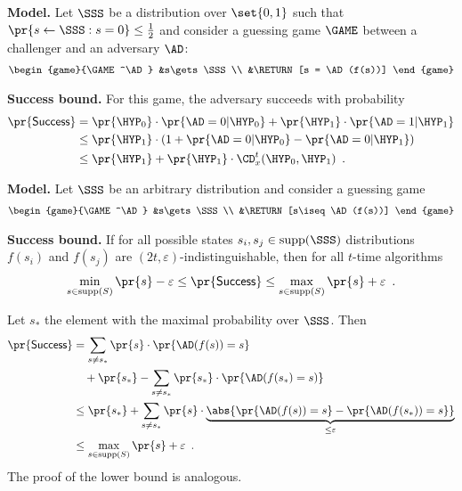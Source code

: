 \documentclass[landscape,footrule]{foils}
\begin{document}

\textbf{Model.} Let $\SSS$ be a distribution over $\set{0,1}$ such that
$\pr{s\gets\SSS:s=0}\leq\frac{1}{2}$ and consider a
guessing game $\GAME$ between a challenger and an adversary $\AD$:
\begin{align*}
  \begin{game}{\GAME^\AD}
    &s\gets\SSS\\
    &\RETURN [s = \AD(f(s))]
  \end{game}
\end{align*}


\textbf{Success bound.} For this game, the adversary succeeds with probability 
\begin{align*}
  \pr{\mathsf{Success}}%
  &=\pr{\HYP_0}\cdot \pr{\smash{\AD=0|\HYP_0}}%
  + \pr{\HYP_1}\cdot \pr{\smash{\AD=1|\HYP_1}}\\
  &\leq \pr{\HYP_1}\cdot%
  (1+\pr{\smash{\AD=0|\HYP_0}}-\pr{\smash{\AD=0|\HYP_1}})\\
  &\leq\pr{\HYP_1}+\pr{\HYP_1}\cdot \CD_x^t(\HYP_0,\HYP_1)\enspace.
\end{align*}



\textbf{Model.} Let $\SSS$ be an arbitrary distribution and consider a
guessing game
\begin{align*}
  \begin{game}{\GAME^\AD}
    &s\gets\SSS\\
    &\RETURN [s\iseq \AD(f(s))]
  \end{game}
\end{align*}

\textbf{Success bound.}  If for all possible states
$s_i,s_j\in\supp(\SSS)$ distributions $f(s_i)$ and $f(s_j)$ are
$(2t,\varepsilon)$-indistinguishable, then for all $t$-time algorithms
\begin{align*}
 \min_{s\in\supp(S)}\pr{s}-\varepsilon \leq \pr{\mathsf{Success}}\leq\max_{s\in\supp(S)}\pr{s}+\varepsilon\enspace. 
\end{align*}


Let $s_*$ the element with the maximal probability over $\SSS$. Then
\begin{align*}
  \pr{\mathsf{Success}}
  &=\sum_{s\neq s_*}\pr{s}\cdot \pr{\AD(f(s))=s}\\
  &\quad +\pr{s_*}-\sum_{s\neq s_*} \pr{s_*}\cdot\pr{\AD(f(s_*)=s)}\\
  &\leq \pr{s_*}+\sum_{s\neq s_*}\pr{s}%
  \cdot \underbrace{\abs{\pr{\AD(f(s))=s}-\pr{\AD(f(s_*))=s}}}_{\leq\varepsilon}\\
  &\leq \max_{s\in\supp(S)}\pr{s}+\varepsilon\enspace.
\end{align*}
The proof of the lower bound is analogous.
\end{document}
